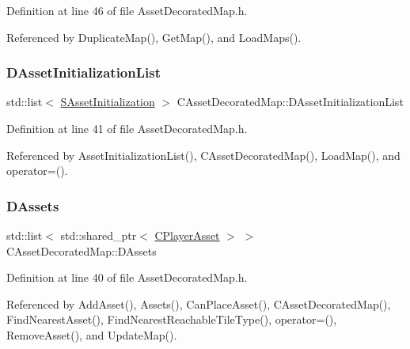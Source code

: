 Definition at line 46 of file Asset\+Decorated\+Map.\+h.



Referenced by Duplicate\+Map(), Get\+Map(), and Load\+Maps().

\hypertarget{classCAssetDecoratedMap_a2b7bf2e9a19a9173093cef32048608c2}{}\label{classCAssetDecoratedMap_a2b7bf2e9a19a9173093cef32048608c2} 
\subsubsection{\texorpdfstring{D\+Asset\+Initialization\+List}{DAssetInitializationList}}
{\footnotesize\ttfamily std\+::list$<$ \hyperlink{structCAssetDecoratedMap_1_1SAssetInitialization}{S\+Asset\+Initialization} $>$ C\+Asset\+Decorated\+Map\+::\+D\+Asset\+Initialization\+List\hspace{0.3cm}{\ttfamily [protected]}}



Definition at line 41 of file Asset\+Decorated\+Map.\+h.



Referenced by Asset\+Initialization\+List(), C\+Asset\+Decorated\+Map(), Load\+Map(), and operator=().

\hypertarget{classCAssetDecoratedMap_a94eeed5b16141169b1ba6cb3842055aa}{}\label{classCAssetDecoratedMap_a94eeed5b16141169b1ba6cb3842055aa} 
\subsubsection{\texorpdfstring{D\+Assets}{DAssets}}
{\footnotesize\ttfamily std\+::list$<$ std\+::shared\+\_\+ptr$<$ \hyperlink{classCPlayerAsset}{C\+Player\+Asset} $>$ $>$ C\+Asset\+Decorated\+Map\+::\+D\+Assets\hspace{0.3cm}{\ttfamily [protected]}}



Definition at line 40 of file Asset\+Decorated\+Map.\+h.



Referenced by Add\+Asset(), Assets(), Can\+Place\+Asset(), C\+Asset\+Decorated\+Map(), Find\+Nearest\+Asset(), Find\+Nearest\+Reachable\+Tile\+Type(), operator=(), Remove\+Asset(), and Update\+Map().

